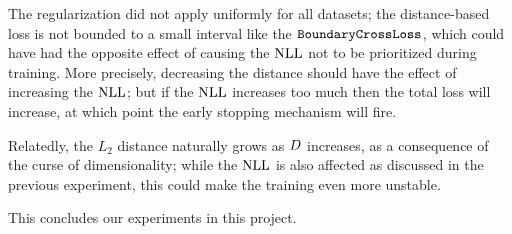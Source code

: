 \documentclass[../main.tex]{subfiles}
\begin{document}
The regularization did not apply uniformly for all datasets; the distance-based loss
is not bounded to a small interval like the $\mathtt{BoundaryCrossLoss}$, which could have had the opposite
effect of causing the $\text{NLL}$ not to be prioritized during training.
More precisely, decreasing the distance should have the effect of increasing the $\text{NLL}$;
but if the $\text{NLL}$ increases too much then
the total loss will increase, at which point the early stopping mechanism will fire.

Relatedly, the $L_2$ distance naturally grows as $D$ increases, as a consequence of the curse
of dimensionality; while the $\text{NLL}$ is also affected as discussed in the previous experiment, this
could make the training even more unstable.
 
This concludes our experiments in this project.
\end{document}
